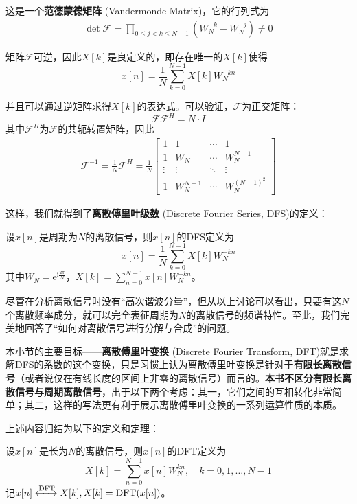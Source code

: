 这是一个\textbf{范德蒙德矩阵} (Vandermonde Matrix)，它的行列式为
\begin{align*}
    \det\mathcal{F}=\prod_{0\leq j<k\leq N-1}(W_N^{-k}-W_N^{-j})\neq 0
\end{align*}

矩阵$\mathcal{F}$可逆，因此$X[k]$是良定义的，即存在唯一的$X[k]$使得
\[x[n]=\frac{1}{N}\sum_{k=0}^{N-1}X[k]W_N^{-kn}\]

并且可以通过逆矩阵求得$X[k]$的表达式。可以验证，$\mathcal{F} $为正交矩阵：
$$\mathcal{F} \mathcal{F} ^H=N\cdot I$$
其中$\mathcal{F} ^H$为$\mathcal{F} $的共轭转置矩阵，因此
\begin{align*}
    \mathcal{F} ^{-1}=\frac{1}{N}\mathcal{F}^H=\frac{1}{N}\begin{bmatrix}1 & 1 & \cdots & 1 \\
    1 & W_N & \cdots & W_N^{N-1} \\
    \vdots & \vdots & \ddots & \vdots \\
    1 & W_N^{N-1} & \cdots & W_N^{(N-1)^2}
    \end{bmatrix}
\end{align*}

这样，我们就得到了\textbf{离散傅里叶级数} (Discrete Fourier Series, DFS)的定义：
\begin{definition}[离散傅里叶级数]
    设$x[n]$是周期为$N$的离散信号，则$x[n]$的DFS定义为
    \[x[n]=\frac{1}{N}\sum_{k=0}^{N-1}X[k]W_N^{-kn}\]
    其中$W_N=\mathrm{e}^{\mathrm{i}\frac{2\pi}{N}}$，$X[k]=\sum_{n=0}^{N-1}x[n]W_N^{-kn}$。
\end{definition}

尽管在分析离散信号时没有“高次谐波分量”，但从以上讨论可以看出，只要有这$N$个离散频率成分，就可以完全表征周期为$N$的离散信号的频谱特性。至此，我们完美地回答了“如何对离散信号进行分解与合成”的问题。

本小节的主要目标——\textbf{离散傅里叶变换} (Discrete Fourier Transform, DFT)就是求解DFS的系数的这个变换，只是习惯上认为离散傅里叶变换是针对于\textbf{有限长离散信号}（或者说仅在有线长度的区间上非零的离散信号）而言的\cite{dsp}。\textbf{本书不区分有限长离散信号与周期离散信号}，出于以下两个考虑：其一，它们之间的互相转化非常简单；其二，这样的写法更有利于展示离散傅里叶变换的一系列运算性质的本质。

上述内容归结为以下的定义和定理：

\begin{definition}[离散傅里叶变换]\label{def:DFT}
    设$x[n]$是长为$N$的离散信号，则$x[n]$的DFT定义为
    \[X[k]=\sum_{n=0}^{N-1}x[n]W_N^{kn},\quad k=0,1,\dots,N-1\]
    记$x[n]\xleftrightarrow{\mathrm{DFT}}X[k],X[k]=\mathrm{DFT}(x[n])$。
\end{definition}

